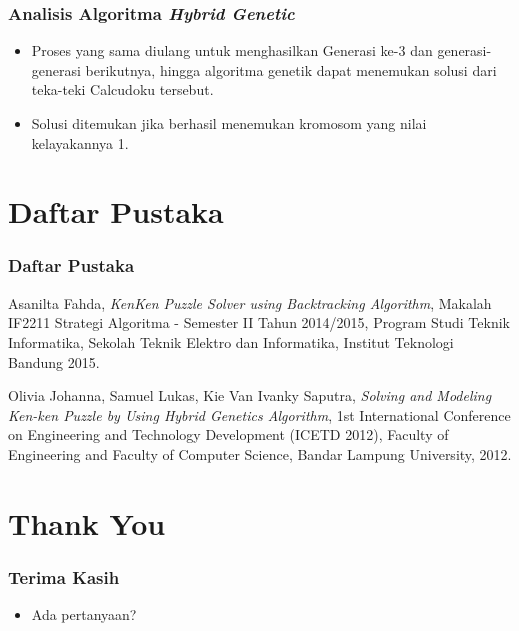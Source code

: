 \documentclass{beamer}
\begin{document}
\begin{frame}
\frametitle{Analisis Algoritma \textit{Hybrid Genetic}}
\begin{itemize}
\item Proses yang sama diulang untuk menghasilkan Generasi ke-3 dan generasi-generasi berikutnya, hingga algoritma genetik dapat menemukan solusi dari teka-teki Calcudoku tersebut.
\item Solusi ditemukan jika berhasil menemukan kromosom yang nilai kelayakannya 1.
\end{itemize}
\end{frame}


\section{Daftar Pustaka}

\begin{frame}
\frametitle{Daftar Pustaka}
\begin{thebibliography}{9}
  Asanilta Fahda,
  \emph{KenKen Puzzle Solver using Backtracking Algorithm},
  Makalah IF2211 Strategi Algoritma - Semester II Tahun 2014/2015,
  Program Studi Teknik Informatika, Sekolah Teknik Elektro dan Informatika, Institut Teknologi Bandung
  2015.

  Olivia Johanna, Samuel Lukas, Kie Van Ivanky Saputra,
  \emph{Solving and Modeling Ken-ken Puzzle by Using Hybrid Genetics Algorithm},
  1st International Conference on Engineering and Technology Development (ICETD 2012),
  Faculty of Engineering and Faculty of Computer Science, Bandar Lampung University,
  2012.
\end{thebibliography}
\end{frame}

\section{Thank You}

\begin{frame}
\frametitle{Terima Kasih}
\begin{itemize}
\item Ada pertanyaan?
\end{itemize}
\end{frame}

\note{

}
\end{document}
